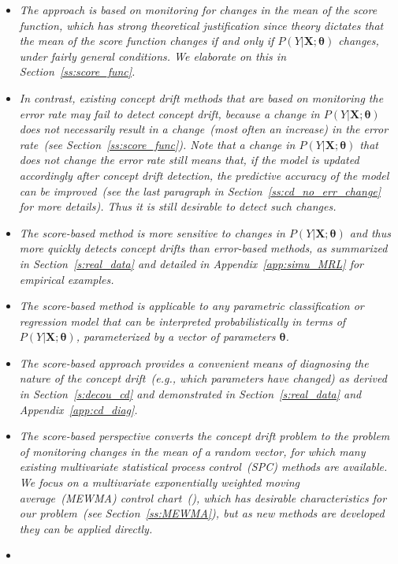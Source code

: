 \documentclass[twoside,11pt]{article}
\begin{document}
\begin{itemize}
\item
\textit{The approach is based on monitoring for changes in the mean of the score function, which has strong theoretical justification since theory dictates that the mean of the score function changes if and only if $P(Y|\bm{X};\bm{\theta})$ changes, under fairly general conditions. We elaborate on this in Section~\ref{ss:score_func}.}
\item
\textit{In contrast, existing concept drift methods that are based on monitoring the error rate may fail to detect concept drift, because a change in $P(Y|\bm{X};\bm{\theta})$ does not necessarily result in a change~(most often an increase) in the error rate~(see Section~\ref{ss:score_func}). Note that a change in $P(Y|\bm{X};\bm{\theta})$ that does not change the error rate still means that, if the model is updated accordingly after concept drift detection, the predictive accuracy of the model can be improved~(see the last paragraph in Section~\ref{ss:cd_no_err_change} for more details). Thus it is still desirable to detect such changes.}
\item
\textit{The score-based method is more sensitive to changes in $P(Y|\bm{X}; \bm{\theta})$ and thus more quickly detects concept drifts than error-based methods, as summarized in Section~\ref{s:real_data} and detailed in Appendix~\ref{app:simu_MRL} for empirical examples.}
\item
\textit{The score-based method is applicable to any parametric classification or regression model that can be interpreted probabilistically in terms of $P(Y|\bm{X};\bm{\theta})$, parameterized by a vector of parameters $\bm{\theta}$.}
\item
\textit{The score-based approach provides a convenient means of diagnosing the nature of the concept drift~(e.g., which parameters have changed) as derived in Section~\ref{s:decou_cd} and demonstrated in Section~\ref{s:real_data} and Appendix~\ref{app:cd_diag}.}
\item
\textit{The score-based perspective converts the concept drift problem to the problem of monitoring changes in the mean of a random vector, for which many existing multivariate statistical process control~(SPC) methods are available. We focus on a multivariate exponentially weighted moving average~(MEWMA) control chart~(\cite{montgomery2007introduction}), which has desirable characteristics for our problem~(see Section~\ref{ss:MEWMA}), but as new methods are developed they can be applied directly.}
\item

\end{itemize}
\end{document}
